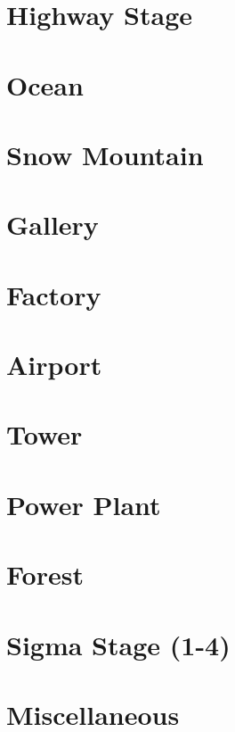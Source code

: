 \section{Highway Stage}
\section{Ocean}
\section{Snow Mountain}
\section{Gallery}\label{Armored_Armadillo_Stage}
\section{Factory}
\section{Airport}
\section{Tower}
\section{Power Plant}
\section{Forest}
\section{Sigma Stage (1-4)}
\section{Miscellaneous}\label{X1:misc} %